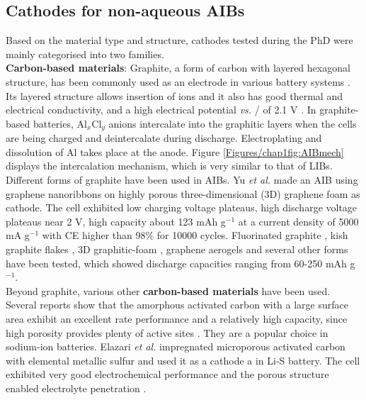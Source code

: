 \subsection{Cathodes for non-aqueous AIBs}
Based on the material type and structure, cathodes tested during the PhD were mainly categorised into two families.\\
\textbf{Carbon-based materials}: Graphite, a form of carbon with layered hexagonal structure, has been commonly used as an electrode in various battery systems \cite{xu_charge-transfer_2007,zhang_novel_2016,wu_carbon_2003,jian_carbon_2015}. Its layered structure allows insertion of ions and it also has good thermal and electrical conductivity, and a high electrical potential \textit{vs.} / of 2.1 V \cite{lin_ultrafast_2015}. In graphite-based batteries, Al$_x$Cl$_y$ anions intercalate into the graphitic layers when the cells are being charged and deintercalate during discharge. Electroplating and dissolution of Al takes place at the anode. Figure \ref{Figures/chap1fig:AIBmech} displays the intercalation mechanism, which is very similar to that of LIBs. Different forms of graphite have been used in AIBs. Yu \textit{et al.} made an AIB using graphene nanoribbons on highly porous three-dimensional (3D) graphene foam as cathode. The cell exhibited low charging voltage plateaus, high discharge voltage plateaus near 2 V, high capacity about 123 mAh g$^{-1}$ at a current density of 5000 mA g$^{-1}$ with CE higher than 98\% for 10000 cycles\cite{yu_graphene_2017}. Fluorinated graphite \cite{rani_fluorinated_2013}, kish graphite flakes \cite{wang_kish_2017}, 3D graphitic-foam \cite{wu_3d_2016}, graphene aerogels\cite{huang_graphene_2019} and several other forms have been tested, which showed discharge capacities ranging from 60-250 mAh g$^{-1}$. \\
Beyond graphite, various other \textbf{carbon-based materials} have been used. Several reports show that the amorphous activated carbon with a large surface area exhibit an excellent rate performance and a relatively high capacity, since high porosity provides plenty of active sites \cite{tang_hollow_2012,li_commercial_2018}. They are a popular choice in sodium-ion batteries\cite{zhu_high_2016,hou_carbon_2015,cao_sodium_2012}. Elazari \textit{et al.} impregnated microporous activated carbon with elemental metallic sulfur and used it as a cathode a in Li-S battery. The cell exhibited very good electrochemical performance and the porous structure enabled electrolyte penetration \cite{elazari_sulfur-impregnated_2011}.  

